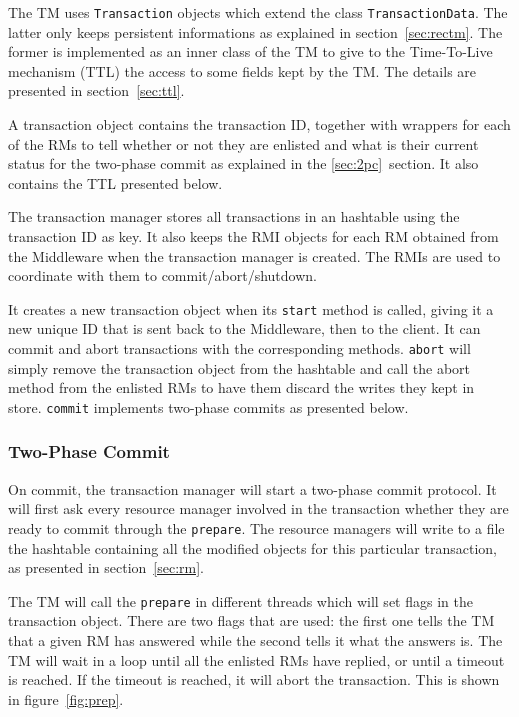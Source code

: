 \documentclass[12pt]{article}
\theoremstyle{plain}%
\theoremstyle{definition}
\theoremstyle{remark}
\newcommand{\java}[1]{{\lstinline!#1!}}
\begin{document}
The TM uses \java{Transaction} objects which extend the class 
\java{TransactionData}. The latter only keeps persistent informations
as explained in section~\ref{sec:rectm}.
The former is implemented as an inner class of the TM to give to
the Time-To-Live mechanism (TTL) the access to some fields kept by
the TM. The details are presented in section~\ref{sec:ttl}.

A transaction object contains the transaction ID, together with wrappers
for each of the RMs to tell whether or not they are enlisted and what
is their current status for the two-phase commit as explained in the
\ref{sec:2pc}~section. It also contains the TTL presented below.

The transaction manager stores all transactions in an hashtable using 
the transaction ID as key. It also keeps the RMI objects for each RM 
obtained from the Middleware when the transaction manager is created. 
The RMIs are used to coordinate with them to commit/abort/shutdown.

It creates a new transaction object when its \java{start} method is 
called, giving it a new unique ID that is sent back to the Middleware, 
then to the client. It can commit and abort transactions with the 
corresponding methods. \java{abort} will simply remove the transaction 
object from the hashtable and call the abort method from the enlisted 
RMs to have them discard the writes they kept in store. \java{commit}
implements two-phase commits as presented below.

\subsubsection{Two-Phase Commit \label{sec:2pc}}

On commit, the transaction manager will start a two-phase commit
protocol. It will first ask every resource manager involved in the
transaction whether they are ready to commit through the \java{prepare}. 
The resource managers will write to a file the hashtable containing 
all the modified objects for this particular transaction, as presented 
in section~\ref{sec:rm}.

The TM will call the \java{prepare} in different threads which will set 
flags in the transaction object. There are two flags that are used: the
first one tells the TM that a given RM has answered while the second
tells it what the answers is. The TM will wait in a loop until all
the enlisted RMs have replied, or until a timeout is reached. If the 
timeout is reached, it will abort the transaction. This is shown in
figure~\ref{fig:prep}.
\end{document}
